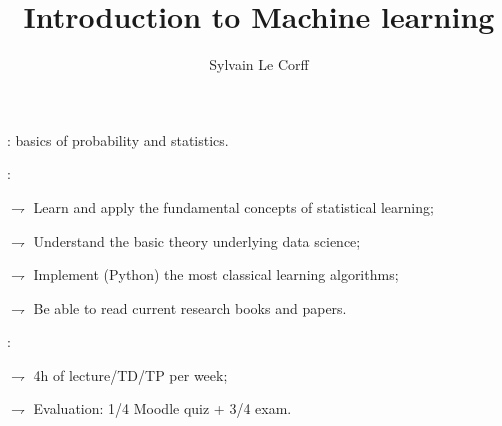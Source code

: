 \documentclass[xcolor={usenames,dvipsnames},handout]{beamer}
\begin{document}
\title[]{Introduction to Machine learning}
\author[]{Sylvain Le Corff}
\date{}

\begin{frame}[plain]
\titlepage
\end{frame}




\begin{frame}
: basics of probability and statistics.

\vspace{.5cm}

:  

\vspace{.2cm}

$\rightharpoondown$ Learn and apply the \alert{fundamental concepts} of statistical learning; 

\vspace{.3cm}

$\rightharpoondown$ Understand the \alert{basic theory} underlying data science;

\vspace{.3cm}


$\rightharpoondown$ Implement (\alert{Python}) the most classical \alert{learning} algorithms;

\vspace{.3cm}

$\rightharpoondown$ Be able to read current research books and papers.

\vspace{.5cm}

: 

\vspace{.2cm}

$\rightharpoondown$ \alert{4h of lecture/TD/TP per week}; 

\vspace{.3cm}

$\rightharpoondown$ \alert{Evaluation}: 1/4 Moodle quiz + 3/4 exam.

\end{frame}
\end{document}

